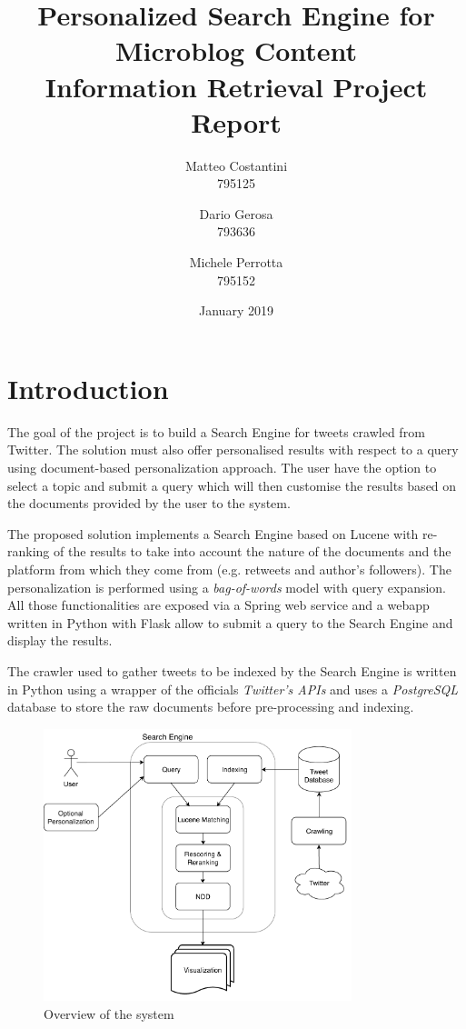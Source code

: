 \documentclass[a4paper,12pt,openany,oneside]{article}
\title{Personalized Search Engine for Microblog Content\\ \large{Information Retrieval Project Report}}
\date{January 2019}
\author{\normalsize Matteo Costantini \\ \normalsize 795125 \and \normalsize Dario Gerosa \\ \normalsize 793636 \and \normalsize Michele Perrotta \\ \normalsize 795152}
\begin{document}
\selectfont
\maketitle

\section{Introduction}
The goal of the project is to build a Search Engine for tweets crawled from Twitter. The solution must also offer personalised results with respect to a query using document-based personalization approach.
The user have the option to select a topic and submit a query which will then customise the results based on the documents provided by the user to the system.

The proposed solution implements a Search Engine based on Lucene with re-ranking of the results to take into account the nature of the documents and the platform from which they come from (e.g. retweets and author's followers). The personalization is performed using a \textit{bag-of-words} model with query expansion. All those functionalities are exposed via a Spring web service and a webapp written in Python with Flask allow to submit a query to the Search Engine and display the results.

The crawler used to gather tweets to be indexed by the Search Engine is written in Python using a wrapper of the officials \textit{Twitter's APIs} and uses a \textit{PostgreSQL} database to store the raw documents before pre-processing and indexing.
\begin{figure}[t]
    \centering
    \includegraphics[width=0.8\textwidth]{search_engine.pdf}
    \caption{Overview of the system}
    \label{fig:search_engine}
\end{figure}
\end{document}
